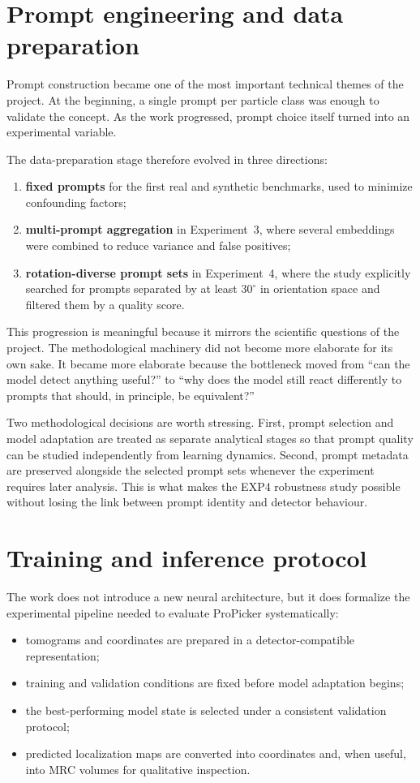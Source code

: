\documentclass[12pt,a4paper]{report}
\begin{document}
\section{Prompt engineering and data preparation}
Prompt construction became one of the most important technical themes of the project. At the beginning, a single prompt per particle class was enough to validate the concept. As the work progressed, prompt choice itself turned into an experimental variable.

The data-preparation stage therefore evolved in three directions:
\begin{enumerate}
  \item \textbf{fixed prompts} for the first real and synthetic benchmarks, used to minimize confounding factors;
  \item \textbf{multi-prompt aggregation} in Experiment~3, where several embeddings were combined to reduce variance and false positives;
  \item \textbf{rotation-diverse prompt sets} in Experiment~4, where the study explicitly searched for prompts separated by at least \(30^\circ\) in orientation space and filtered them by a quality score.
\end{enumerate}

This progression is meaningful because it mirrors the scientific questions of the project. The methodological machinery did not become more elaborate for its own sake. It became more elaborate because the bottleneck moved from \enquote{can the model detect anything useful?} to \enquote{why does the model still react differently to prompts that should, in principle, be equivalent?}

Two methodological decisions are worth stressing. First, prompt selection and model adaptation are treated as separate analytical stages so that prompt quality can be studied independently from learning dynamics. Second, prompt metadata are preserved alongside the selected prompt sets whenever the experiment requires later analysis. This is what makes the EXP4 robustness study possible without losing the link between prompt identity and detector behaviour.

\section{Training and inference protocol}
The work does not introduce a new neural architecture, but it does formalize the experimental pipeline needed to evaluate ProPicker systematically:
\begin{itemize}
  \item tomograms and coordinates are prepared in a detector-compatible representation;
  \item training and validation conditions are fixed before model adaptation begins;
  \item the best-performing model state is selected under a consistent validation protocol;
  \item predicted localization maps are converted into coordinates and, when useful, into MRC volumes for qualitative inspection.
\end{itemize}
\end{document}
